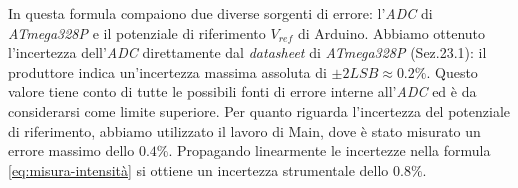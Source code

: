   In questa formula compaiono due diverse sorgenti di errore:
  l'\emph{ADC} di \emph{ATmega328P} e il potenziale di riferimento $V_{ref}$
  di Arduino.
  Abbiamo ottenuto l’incertezza dell’\emph{ADC} direttamente dal
  \emph{datasheet}\cite{atmega} di \emph{ATmega328P} (Sez.23.1):
  il produttore indica un'incertezza massima assoluta di $\pm 2LSB \approx 0.2\%$.
  Questo valore tiene conto di tutte le possibili fonti di errore interne
  all’\emph{ADC} ed è da considerarsi come limite superiore.
  Per quanto riguarda l'incertezza del potenziale di riferimento, abbiamo
  utilizzato il lavoro di Main\cite{main}, dove è stato misurato un errore
  massimo dello $0.4\%$.
  Propagando linearmente le incertezze nella formula \eqref{eq:misura-intensità} si ottiene un incertezza
  strumentale dello $0.8\%$.

